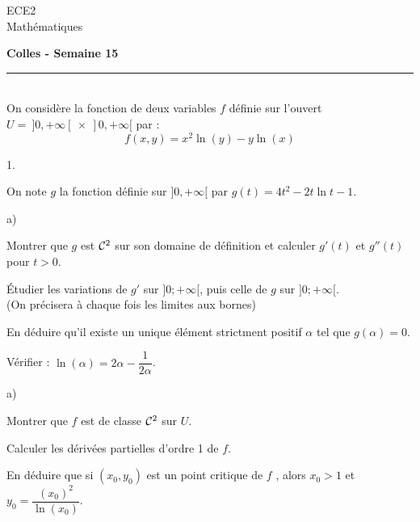\documentclass[11pt]{article}%
\begin{document}
\begin{flushleft}
ECE2 \\
Mathématiques
\end{flushleft}

\begin{center}
\textbf{\Large{Colles - Semaine 15}}
\end{center}

\hrule

\vspace*{0,2cm}

\begin{exercice}[ESC 2005]~\\
\noindent
On considère la fonction de deux variables $f$ définie sur l'ouvert\\ 
$U = \ ]0,+\infty [ \ \times \ ]0,+\infty [$ par :%
\[
  f(x,y)=x^{2}\ln (y) - y\ln (x)
\]

\begin{noliste}{1.}
  \item On note $g$ la fonction définie sur $]0,+\infty [$ par $%
  g(t) = 4t^{2}-2t\ln t-1$.
  \begin{noliste}{a)}
    \item Montrer que $g$ est $\mathcal{C}^{2}$ sur son domaine de définition et 
    calculer $g'(t)$ et $g''(t)$ pour $t>0$.
    
    \item Étudier les variations de $g'$ sur $]0;+\infty [ $, puis
    celle de $g$ sur $]0;+\infty [ $.\\
    (On précisera à chaque fois les limites aux bornes)
    
    \item En déduire qu'il existe un unique élément strictment positif 
    $\alpha$
    tel que $g(\alpha)=0$.
    
    \item Vérifier : $\ln (\alpha) =2\alpha -\dfrac{1}{2\alpha }$.
  \end{noliste}
  
  \item 
  \begin{noliste}{a)}
    \item Montrer que $f$ est de classe $\mathcal{C}^{2}$ sur $U$.
    
    \item Calculer les dérivées partielles d'ordre 1 de $f$.
    
    \item En déduire que si $(x_{0},y_{0})$ est un point critique de $f$ , 
    alors $x_{0}>1$ et $y_{0}=\dfrac{(x_{0})^{2}}{\ln (x_{0})}$.
    

\end{noliste}
\end{noliste}
\end{exercice}
\end{document}
